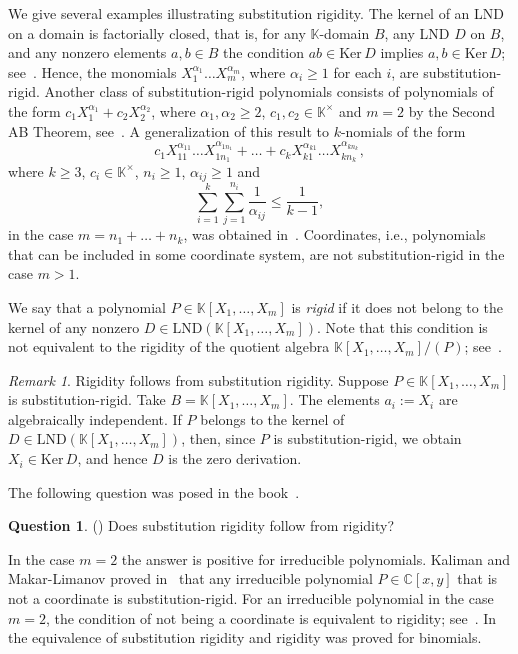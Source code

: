 \documentclass[12pt,reqno]{amsart}
\newcommand{\KK}{\mathbb K}
\newcommand{\Ker}{\mathrm{Ker}\,}
\theoremstyle{plain}
\theoremstyle{remark}
\newtheorem{remark}{Remark}
\theoremstyle{definition}
\newtheorem{question}{Question}
\begin{document}
We give several examples illustrating substitution rigidity. The kernel of an LND on a domain is factorially closed, that is, for any $\mathbb K$-domain $B$, any LND $D$ on $B$, and any nonzero elements $a,b\in B$ the condition $ab\in \Ker D$ implies $a,b\in\Ker D$; see~\cite[Principle 1 (a)]{F}. Hence, the monomials $X_1^{\alpha_1}\dots X_m^{\alpha_m}$, where $\alpha_i\geq 1$ for each $i$, are substitution-rigid. Another class of substitution-rigid polynomials consists of polynomials of the form ${c_1X_1^{\alpha_1}+c_2X_2^{\alpha_2}}$, where ${\alpha_1,\alpha_2\geq 2}$, ${c_1,c_2\in\mathbb{K}^{\times}}$ and $m=2$ by the Second AB Theorem, see~\cite[Theorem 2.50]{F}. A generalization of this result to $k$-nomials of the form
$$c_1 X_{11}^{\alpha_{11}}\dots X_{1n_1}^{\alpha_{1n_1}}+\dots +c_k X_{k1}^{\alpha_{k1}}\dots X_{kn_k}^{\alpha_{kn_k}},$$
where $k\geq 3$, $c_i\in\KK^{\times}$, $n_i\geq 1$, $\alpha_{ij}\geq 1$ and $$\sum_{i=1}^{k}\sum_{j=1}^{n_i} \frac{1}{\alpha_{ij}}\leq \frac{1}{k-1},$$ in the case $m=n_1+\dots +n_k$, was obtained in~\cite[Theorem 3.3]{K23}. Coordinates, i.e., polynomials that can be included in some coordinate system, are not substitution-rigid in the case ${m>1}$.

We say that a polynomial $P\in \mathbb{K}[X_1,\dots,X_m]$ is \textit{rigid} if it does not belong to the kernel of any nonzero $D\in\mathrm{LND}(\mathbb{K}[X_1,\dots, X_m])$. Note that this condition is not equivalent to the rigidity of the quotient algebra $\KK[X_1,\dots,X_m]/(P)$; see~\cite[Example 1]{K26}.

\begin{remark}
Rigidity follows from substitution rigidity. Suppose $P\in\mathbb{K}[X_1,\dots,X_m]$ is substitution-rigid. Take $B=\mathbb{K}[X_1,\dots,X_m]$. The elements $a_i:=X_i$ are algebraically independent. If $P$ belongs to the kernel of ${D\in\mathrm{LND}(\mathbb{K}[X_1,\dots,X_m])}$, then, since $P$ is substitution-rigid, we obtain $X_i\in\Ker D$, and hence $D$ is the zero derivation.
\end{remark}

The following question was posed in the book~\cite{F}.
\begin{question}(\cite[Question 11.9]{F})
\label{q}
Does substitution rigidity follow from rigidity?
\end{question}

In the case $m=2$ the answer is positive for irreducible polynomials. Kaliman and Makar-Limanov proved in~\cite[Corollary 2.1]{KML} that any irreducible polynomial $P\in\mathbb{C}[x,y]$ that is not a coordinate is substitution-rigid. For an irreducible polynomial in the case $m=2$, the condition of not being a coordinate is equivalent to rigidity; see~\cite[Section 11.7]{F}. In~\cite{K26} the equivalence of substitution rigidity and rigidity was proved for binomials.
\end{document}
